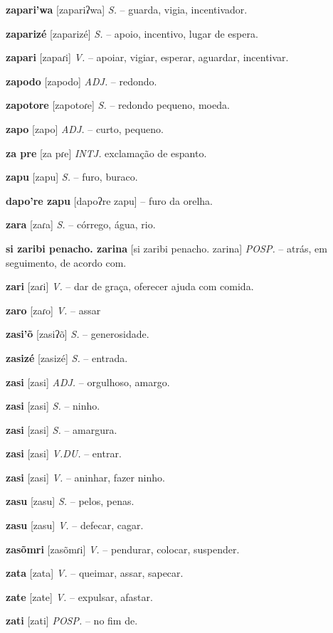 \textbf{zapari'wa} [zapariʔwa] \textit{S.} -- guarda, vigia, incentivador.

\textbf{zaparizé} [zaparizé] \textit{S.} -- apoio, incentivo, lugar de espera.

\textbf{zapari} [zapaɾi] \textit{V.} -- apoiar, vigiar, esperar, aguardar, incentivar.

\textbf{zapodo} [zapodo] \textit{ADJ.} -- redondo.

\textbf{zapotore} [zapotoɾe] \textit{S.} -- redondo pequeno, moeda.

\textbf{zapo} [zapo] \textit{ADJ.} -- curto, pequeno.

\textbf{za pre} [za pɾe] \textit{INTJ.} exclamação de espanto.

\textbf{zapu} [zapu] \textit{S.} -- furo, buraco.

\textbf{dapo're zapu} [dapoʔre zapu] -- furo da orelha.

\textbf{zara} [zaɾa] \textit{S.} -- córrego, água, rio.

\textbf{si zaribi penacho. zarina} [si zaribi penacho. zarina] \textit{POSP.} -- atrás, em seguimento, de acordo com.

\textbf{zari} [zaɾi] \textit{V.} -- dar de graça, oferecer ajuda com comida.

\textbf{zaro} [zaɾo] \textit{V.} -- assar

\textbf{zasi'õ} [zasiʔõ] \textit{S.} -- generosidade.

\textbf{zasizé} [zasizé] \textit{S.} -- entrada.

\textbf{zasi} [zasi] \textit{ADJ.} -- orgulhoso, amargo.

\textbf{zasi} [zasi] \textit{S.} -- ninho.

\textbf{zasi} [zasi] \textit{S.} -- amargura.

\textbf{zasi} [zasi] \textit{V.DU.} -- entrar.

\textbf{zasi} [zasi] \textit{V.} -- aninhar, fazer ninho.

\textbf{zasu} [zasu] \textit{S.} -- pelos, penas.

\textbf{zasu} [zasu] \textit{V.} -- defecar, cagar.

\textbf{zasõmri} [zasõmɾi] \textit{V.} -- pendurar, colocar, suspender.

\textbf{zata} [zata] \textit{V.} -- queimar, assar, sapecar.

\textbf{zate} [zate] \textit{V.} -- expulsar, afastar.

\textbf{zati} [zati] \textit{POSP.} -- no fim de.

